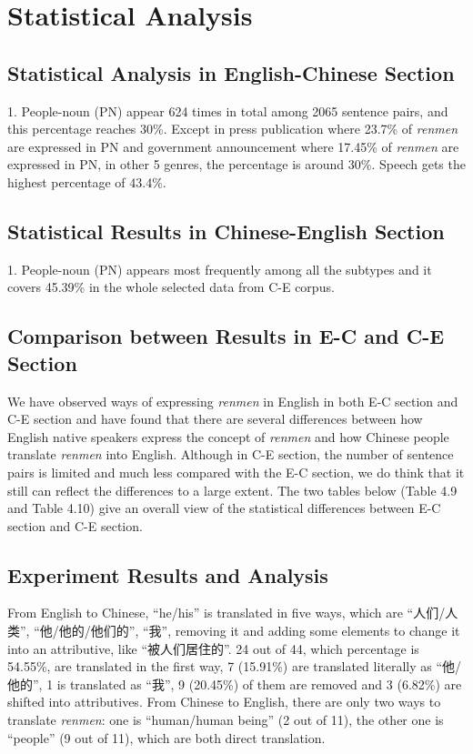 \documentclass[degree=bachelor,language=english]{thuthesis}
\begin{document}
\section{Statistical Analysis}

\subsection{Statistical Analysis in English-Chinese Section}

1. People-noun (PN) appear 624 times in total among 2065 sentence pairs, and this percentage reaches 30\%. Except in press publication where 23.7\% of \emph{renmen} are expressed in PN and government announcement where 17.45\% of \emph{renmen} are expressed in PN, in other 5 genres, the percentage is around 30\%. Speech gets the highest percentage of 43.4\%.


\subsection{Statistical Results in Chinese-English Section}

1. People-noun (PN) appears most frequently among all the subtypes and it covers 45.39\% in the whole selected data from C-E corpus.


\subsection{Comparison between Results in E-C and C-E Section}

We have observed ways of expressing \emph{renmen} in English in both E-C section and C-E section and have found that there are several differences between how English native speakers express the concept of \emph{renmen} and how Chinese people translate \emph{renmen} into English. Although in C-E section, the number of sentence pairs is limited and much less compared with the E-C section, we do think that it still can reflect the differences to a large extent. The two tables below (Table 4.9 and Table 4.10) give an overall view of the statistical differences between E-C section and C-E section.


\subsection{Experiment Results and Analysis}

From English to Chinese, “he/his” is translated in five ways, which are “人们/人类”, “他/他的/他们的”, “我”, removing it and adding some elements to change it into an attributive, like “被人们居住的”. 24 out of 44, which percentage is 54.55\%, are translated in the first way, 7 (15.91\%) are translated literally as “他/他的”, 1 is translated as “我”, 9 (20.45\%) of them are removed and 3 (6.82\%) are shifted into attributives. From Chinese to English, there are only two ways to translate \emph{renmen}: one is “human/human being” (2 out of 11), the other one is “people” (9 out of 11), which are both direct translation.
\end{document}
